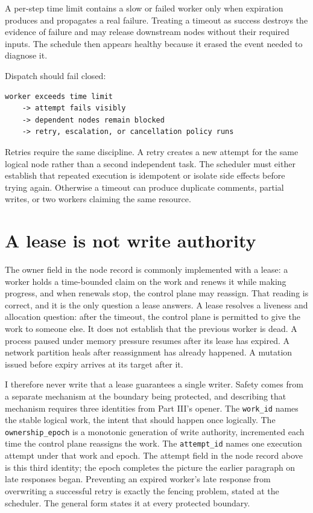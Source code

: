 A per-step time limit contains a slow or failed worker only when expiration produces and propagates a real failure. Treating a timeout as success destroys the evidence of failure and may release downstream nodes without their required inputs. The schedule then appears healthy because it erased the event needed to diagnose it.

Dispatch should fail closed:

\begin{verbatim}
worker exceeds time limit
    -> attempt fails visibly
    -> dependent nodes remain blocked
    -> retry, escalation, or cancellation policy runs
\end{verbatim}

Retries require the same discipline. A retry creates a new attempt for the same logical node rather than a second independent task. The scheduler must either establish that repeated execution is idempotent or isolate side effects before trying again. Otherwise a timeout can produce duplicate comments, partial writes, or two workers claiming the same resource.

\hypertarget{a-lease-is-not-write-authority}{%
\section{A lease is not write authority}\label{a-lease-is-not-write-authority}}

The owner field in the node record is commonly implemented with a lease: a worker holds a time-bounded claim on the work and renews it while making progress, and when renewals stop, the control plane may reassign. That reading is correct, and it is the only question a lease answers. A lease resolves a liveness and allocation question: after the timeout, the control plane is permitted to give the work to someone else. It does not establish that the previous worker is dead. A process paused under memory pressure resumes after its lease has expired. A network partition heals after reassignment has already happened. A mutation issued before expiry arrives at its target after it.

I therefore never write that a lease guarantees a single writer. Safety comes from a separate mechanism at the boundary being protected, and describing that mechanism requires three identities from Part III's opener. The \texttt{work\_id} names the stable logical work, the intent that should happen once logically. The \texttt{ownership\_epoch} is a monotonic generation of write authority, incremented each time the control plane reassigns the work. The \texttt{attempt\_id} names one execution attempt under that work and epoch. The attempt field in the node record above is this third identity; the epoch completes the picture the earlier paragraph on late responses began. Preventing an expired worker's late response from overwriting a successful retry is exactly the fencing problem, stated at the scheduler. The general form states it at every protected boundary.

